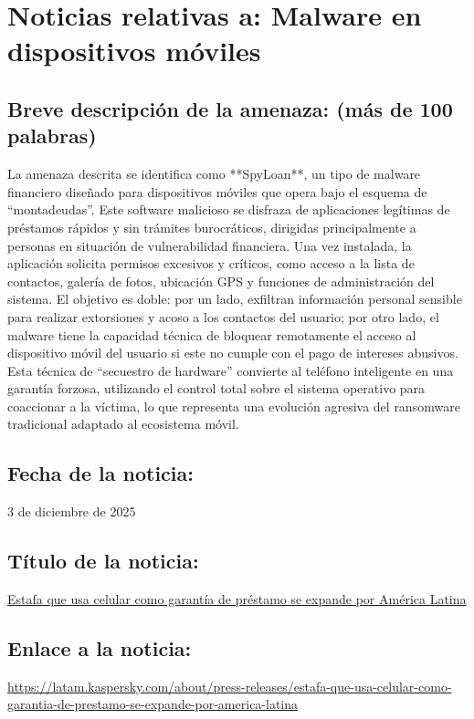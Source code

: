 \chapter{Noticias relativas a: Malware en dispositivos móviles}

    \section{Breve descripción de la amenaza: (más de 100 palabras)}
    La amenaza descrita se identifica como **SpyLoan**, 
    un tipo de malware financiero diseñado para 
    dispositivos móviles que opera bajo el esquema de 
    ``montadeudas''. Este software malicioso se disfraza 
    de aplicaciones legítimas de préstamos rápidos y 
    sin trámites burocráticos, dirigidas principalmente 
    a personas en situación de vulnerabilidad financiera. 
    Una vez instalada, la aplicación solicita permisos 
    excesivos y críticos, como acceso a la lista de 
    contactos, galería de fotos, ubicación GPS y 
    funciones de administración del sistema. 
    El objetivo es doble: por un lado, exfiltran 
    información personal sensible para realizar 
    extorsiones y acoso a los contactos del usuario; 
    por otro lado, el malware tiene la capacidad técnica 
    de bloquear remotamente el acceso al dispositivo 
    móvil del usuario si este no cumple con el pago de 
    intereses abusivos. Esta técnica de ``secuestro de 
    hardware'' convierte al teléfono inteligente en una 
    garantía forzosa, utilizando el control total sobre 
    el sistema operativo para coaccionar a la víctima, 
    lo que representa una evolución agresiva del 
    ransomware tradicional adaptado al ecosistema móvil.

    \section{Fecha de la noticia:}
    3 de diciembre de 2025
   
    \section{Título de la noticia:}
    \href{https://latam.kaspersky.com/about/press-releases/estafa-que-usa-celular-como-garantia-de-prestamo-se-expande-por-america-latina}{Estafa que usa celular como garantía de préstamo se expande por América Latina}

    \section{Enlace a la noticia:}
    \href{https://latam.kaspersky.com/about/press-releases/estafa-que-usa-celular-como-garantia-de-prestamo-se-expande-por-america-latina}{https://latam.kaspersky.com/about/press-releases/estafa-que-usa-celular-como-garantia-de-prestamo-se-expande-por-america-latina}

